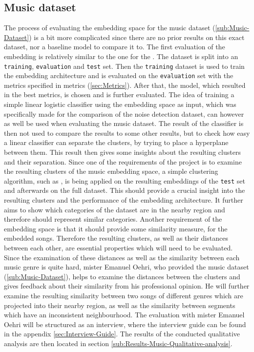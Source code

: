 \subsection{Music dataset}
\label{sub:Eval-Music}
The process of evaluating the embedding space for the music dataset (\ref{sub:Music-Dataset}) is a bit more complicated since there are no prior results on this exact dataset, nor a baseline model to compare it to. The first evaluation of the embedding is relatively similar to the one for the . The dataset is split into an \texttt{training}, \texttt{evaluation} and \texttt{test} set. Then the \texttt{training} dataset is used to train the embedding architecture and is evaluated on the \texttt{evaluation} set with the metrics specified in metrics (\ref{sec:Metrics}). After that, the model, which resulted in the best metrics, is chosen and is further evaluated.
\newline
\newline
The idea of training a simple linear logistic classifier using the embedding space as input, which was specifically made for the comparison of the noise detection dataset, can however as well be used when evaluating the music dataset. The result of the classifier is then not used to compare the results to some other results, but to check how easy a linear classifier can separate the clusters, by trying to place a hyperplane between them. This result then gives some insights about the resulting clusters and their separation.
\newline
\newline
Since one of the requirements of the project is to examine the resulting clusters of the music embedding space, a simple clustering algorithm, such as , is being applied on the resulting embeddings of the \texttt{test} set and afterwards on the full dataset. This should provide a crucial insight into the resulting clusters and the performance of the embedding architecture. It further aims to show which categories of the dataset are in the nearby region and therefore should represent similar categories. 
\newline
\newline
Another requirement of the embedding space is that it should provide some similarity measure, for the embedded songs. Therefore the resulting clusters, as well as their distances between each other, are essential properties which will need to be evaluated. Since the examination of these distances as well as the similarity between each music genre is quite hard, mister Emanuel Oehri, who provided the music dataset (\ref{sub:Music-Dataset}), helps to examine the distances between the clusters and gives feedback about their similarity from his professional opinion. He will further examine the resulting similarity between two songs of different genres which are projected into their nearby region, as well as the similarity between segments which have an inconsistent neighbourhood. The evaluation with mister Emanuel Oehri will be structured as an interview, where the interview guide can be found in the appendix \ref{sec:Interview-Guide}. The results of the conducted qualitative analysis are then located in section \ref{sub:Results-Music-Qualitative-analysis}.

